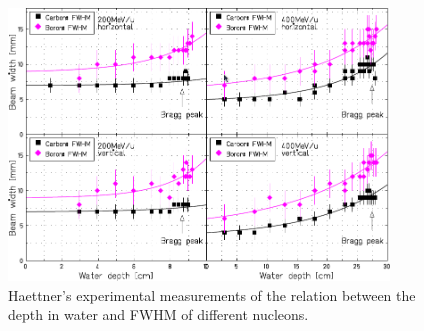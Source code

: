 


\begin{figure}[h] 
\begin{center}
\includegraphics[width=0.9\textwidth]{images/haettner48.png}  
\caption{\label{fig:haettner48} Haettner's experimental measurements of the relation between the depth in water and FWHM of different nucleons.}
 \end{center}
 \end{figure}

